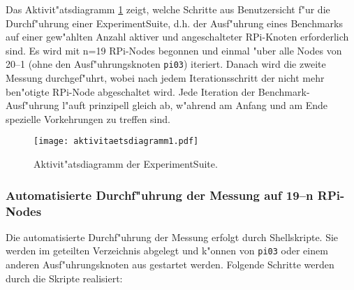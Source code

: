 Das Aktivit"atsdiagramm \ref{fig:Aktivitaetsdiagramm} zeigt, welche Schritte aus Benutzersicht f"ur die Durchf"uhr\-ung einer ExperimentSuite, d.h. der Ausf"uhrung eines Benchmarks auf einer gew"ahlten Anzahl aktiver und angeschalteter RPi-Knoten erforderlich sind. Es wird mit n=19 RPi-Nodes begonnen und einmal "uber alle Nodes von 20--1 (ohne den Ausf"uhrungsknoten \texttt{pi03}) iteriert. Danach wird die zweite Messung durchgef"uhrt, wobei nach jedem Iterationsschritt der nicht mehr ben"otigte RPi-Node abgeschaltet wird. Jede Iteration der Benchmark-Ausf"uhrung l"auft prinzipell gleich ab, w"ahrend am Anfang und am Ende spezielle Vorkehrungen zu treffen sind. 
\begin{figure}[htb]
  \centering
  \texttt{[image: aktivitaetsdiagramm1.pdf]}\\ 
  \caption{Aktivit"atsdiagramm der ExperimentSuite.}
  \label{fig:Aktivitaetsdiagramm}
\end{figure}

\subsubsection{Automatisierte Durchf"uhrung der Messung auf 19--n RPi-Nodes} 

Die automatisierte Durchf"uhrung der Messung erfolgt durch Shellskripte. Sie werden im geteilten Verzeichnis abgelegt und k"onnen von \texttt{pi03} oder einem anderen Ausf"uhrungsknoten aus gestartet werden. Folgende Schritte werden durch die Skripte realisiert: 

